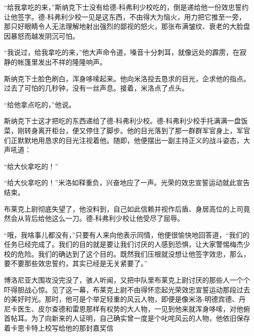     “给我拿吃的来，”斯纳克下士没有给德-科弗利少校吃的，倒是递给他一份效忠誓约让他签字。德-科弗利少校一见是这东西，不由得大为恼火，用力把它推至一旁，那只好眼睛令人无法理解地射出强烈的鄙视的怒火，那张布满皱纹、衰老的大脸盘因暴怒而越发阴沉可怕。

    “我说过，给我拿吃的来，”他大声命令道，嗓音十分刺耳，就像远处的霹雳，在寂静的帐篷里发出不祥的隆隆响声。

    斯纳克下士脸色刷白，浑身哆嗦起来。他向米洛投去恳求的目光，企求他的指点。过去了可怕的几秒钟，没有一丝声息。接着，米洛点了点头。

    “给他拿点吃的，”他说。

    斯纳克下士这才把吃的东西递给了德-科弗利少校。德-科弗利少校手托满满一盘饭菜，刚转身离开柜台，便又停住了脚步。他的目光落到了那一群群军官身上，军官们正默默地用恳求的目光注视着他。随即，他便摆出一副主持正义的战斗姿态，大声吼道：

    “给大伙拿吃的！”

    “给大伙拿吃的！”米洛如释重负，兴奋地应了一声。光荣的效忠宣誓运动就此宣告结束。

    布莱克上尉彻底失望了，他没料到，自己如此信赖并视作后盾、身居高位的上司竟然会从背后给他这么一刀。德-科弗利少校让他受尽了屈辱。

    “哦，我啥事儿都没有，”只要有人来向他表示同情，他便很愉快地回答道，“我们的任务已经完成了。我们的目的就是要让我们讨厌的人感到恐惧，让大家警惕梅杰少校的危险。我们的确达到了这个目的。既然我们压根就没想让他签字效忠，那么，要不要那些效忠誓约，其实已经是无关紧要了。”

    博洛尼亚大围攻没完没了，骇人听闻，又把中队里布莱克上尉讨厌的那些人一个个吓得胆战心惊。见了这一幕，布莱克上尉不由得怀恋起光荣效忠宣誓运动那段过去的美好时光。那时，他可是个举足轻重的风云人物，即便是像米洛-明德宾德、丹尼卡医生、皮尔查德和雷恩那样有权势的大人物，一见到他来就浑身哆嗦，对他俯首帖耳。为了向新来的人证明，自己确实曾一度是个叱咤风云的人物，他依旧保存着卡思卡特上校写给他的那封嘉奖信
